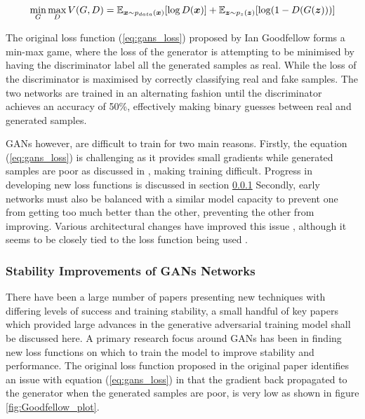 \documentclass[12pt]{article}
\begin{document}
\begin{equation} \label{eq:gans_loss}
    \min_{G} \max_{D} V(G, D) = \mathbb{E}_{{\boldsymbol{{x}}} \sim p_{data}({\boldsymbol{{x}}})} [\log D({\boldsymbol{{x}}})]
                              + \mathbb{E}_{{\boldsymbol{{z}}} \sim p_{z}({\boldsymbol{{z}}})} [\log (1 - D(G({\boldsymbol{{z}}})))]
\end{equation}

\noindent The original loss function (\ref{eq:gans_loss}) proposed by Ian Goodfellow forms a min-max game, where the loss of the generator is attempting to be minimised by having the discriminator label all the generated samples as real.
While the loss of the discriminator is maximised by correctly classifying real and fake samples.
The two networks are trained in an alternating fashion until the discriminator achieves an accuracy of 50\%, effectively making binary guesses between real and generated samples.

GANs however, are difficult to train for two main reasons.
Firstly, the equation (\ref{eq:gans_loss}) is challenging as it provides small gradients while generated samples are poor as discussed in \cite{Goodfellow2014}, making training difficult.
Progress in developing new loss functions is discussed in section \ref{Stability_to_GANs}
Secondly, early networks must also be balanced with a similar model capacity to prevent one from getting too much better than the other, preventing the other from improving.
Various architectural changes have improved this issue \cite{Radford2016, Zhang2018}, although it seems to be closely tied to the loss function being used \cite{Gulrajani2017}.

\subsubsection{Stability Improvements of GANs Networks} \label{Stability_to_GANs}
There have been a large number of papers presenting new techniques with differing levels of success and training stability, a small handful of key papers which provided large advances in the generative adversarial training model shall be discussed here.
A primary research focus around GANs has been in finding new loss functions on which to train the model to improve stability and performance.
The original loss function proposed in the original paper \cite{Goodfellow2014} identifies an issue with equation (\ref{eq:gans_loss}) in that the gradient back propagated to the generator when the generated samples are poor, is very low as shown in figure \ref{fig:Goodfellow_plot}.
\end{document}
